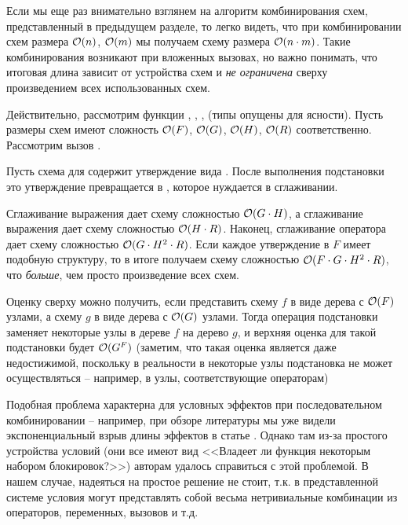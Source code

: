 Если мы еще раз внимательно взглянем на алгоритм комбинирования схем, представленный в предыдущем разделе, то легко видеть, что при комбинировании схем размера $\mathcal{O}(n)$, $\mathcal{O}(m)$ мы получаем схему размера $\mathcal{O}(n \cdot m)$. Такие комбинирования возникают при вложенных вызовах, но важно понимать, что итоговая длина зависит от устройства схем и \emph{не ограничена} сверху произведением всех использованных схем. 

Действительно, рассмотрим функции , , ,  (типы опущены для ясности). Пусть размеры схем имеют сложность $\mathcal{O}(F)$, $\mathcal{O}(G)$, $\mathcal{O}(H)$, $\mathcal{O}(R)$ соответственно. Рассмотрим вызов . 

Пусть схема для  содержит утверждение вида . После выполнения подстановки это утверждение превращается в , которое нуждается в сглаживании. 

Сглаживание выражения  дает схему сложностью $\mathcal{O}(G \cdot H)$, а сглаживание выражения  дает схему сложностью $\mathcal{O}(H \cdot R)$. Наконец, сглаживание оператора \code{==} дает схему сложностью $\mathcal{O}(G \cdot H^2 \cdot R)$. Если каждое утверждение в $F$ имеет подобную структуру, то в итоге получаем схему сложностью $\mathcal{O}(F \cdot G \cdot H^2 \cdot R)$, что \emph{больше}, чем просто произведение всех схем.

Оценку сверху можно получить, если представить схему $f$ в виде дерева с $\mathcal{O}(F)$ узлами, а схему $g$ в виде дерева с $\mathcal{O}(G)$ узлами. Тогда операция подстановки заменяет некоторые узлы в дереве $f$ на дерево $g$, и верхняя оценка для такой подстановки будет $\mathcal{O}(G^F)$ (заметим, что такая оценка является даже недостижимой, поскольку в реальности в некоторые узлы подстановка не может осуществляться -- например, в узлы, соответствующие операторам)

Подобная проблема характерна для условных эффектов при последовательном комбинировании -- например, при обзоре литературы мы уже видели экспоненциальный взрыв длины эффектов в статье  \cite{Flanagan08}. Однако там из-за простого устройства условий (они все имеют вид <<Владеет ли функция некоторым набором блокировок?>>) авторам удалось справиться с этой проблемой. В нашем случае, надеяться на простое решение не стоит, т.к. в представленной системе условия могут представлять собой весьма нетривиальные комбинации из операторов, переменных, вызовов и т.д.

